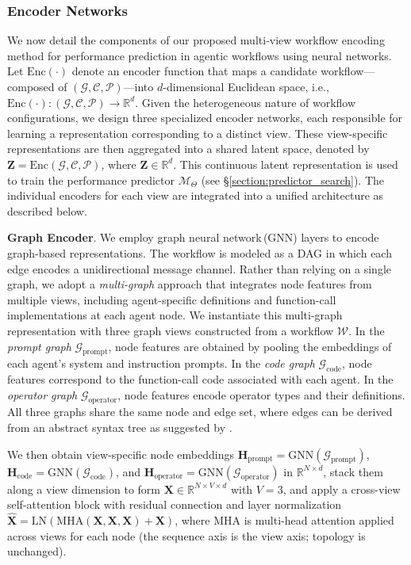 \subsubsection{Encoder Networks}
We now detail the components of our proposed multi-view workflow encoding method for performance prediction in agentic workflows using neural networks. Let $\mathrm{Enc}(\cdot)$ denote an encoder function that maps a candidate workflow---composed of $(\mathcal{G}, \mathcal{C}, \mathcal{P})$---into $d$-dimensional Euclidean space, i.e., $\mathrm{Enc}(\cdot) : (\mathcal{G}, \mathcal{C}, \mathcal{P}) \to \mathbb{R}^d$. Given the heterogeneous nature of workflow configurations, we design three specialized encoder networks, each responsible for learning a representation corresponding to a distinct view. These view-specific representations are then aggregated into a shared latent space, denoted by $\mathbf{Z} = \mathrm{Enc}(\mathcal{G}, \mathcal{C}, \mathcal{P})$, where $\mathbf{Z} \in \mathbb{R}^d$. This continuous latent representation is used to train the performance predictor $\mathcal{M}_{\Theta}$ (see \S\ref{section:predictor_search}). The individual encoders for each view are integrated into a unified architecture as described below.

\textbf{Graph Encoder}. We employ graph neural network\,(GNN) layers to encode graph-based representations. The workflow is modeled as a DAG in which each edge encodes a unidirectional message channel. Rather than relying on a single graph, we adopt a \emph{multi-graph} approach that integrates node features from multiple views, including agent-specific definitions and function-call implementations at each agent node. We instantiate this multi-graph representation with three graph views constructed from a workflow $\mathcal{W}$. In the \emph{prompt graph} $\mathcal{G}_{\text{prompt}}$, node features are obtained by pooling the embeddings of each agent's system and instruction prompts. In the \emph{code graph} $\mathcal{G}_{\text{code}}$, node features correspond to the function-call code associated with each agent. In the \emph{operator graph} $\mathcal{G}_{\text{operator}}$, node features encode operator types and their definitions. All three graphs share the same node and edge set, where edges can be derived from an abstract syntax tree as suggested by \citet{FLORA_Bench_25}. 

We then obtain view-specific node embeddings $\mathbf{H}_{\text{prompt}}=\mathrm{GNN}(\mathcal{G}_{\text{prompt}})$, $\mathbf{H}_{\text{code}}=\mathrm{GNN}(\mathcal{G}_{\text{code}})$, and $\mathbf{H}_{\text{operator}}=\mathrm{GNN}(\mathcal{G}_{\text{operator}})$ in $\mathbb{R}^{N\times d}$, stack them along a view dimension to form $\mathbf{X}\in\mathbb{R}^{N\times V\times d}$ with $V = 3$, and apply a cross-view self-attention block with residual connection and layer normalization $\hat{\mathbf{X}} = \mathrm{LN}\!\left(\mathrm{MHA}(\mathbf{X},\mathbf{X},\mathbf{X}) + \mathbf{X}\right)$, where $\mathrm{MHA}$ is multi-head attention applied across views for each node (the sequence axis is the view axis; topology is unchanged). 

